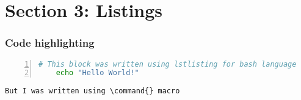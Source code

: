 \documentclass[11pt,aspectratio=169]{beamer}  %
\newcommand*{\escape}[1]{\textbackslash#1}
\newcommand{\command}[1]{\colorbox{blue!20}{\texttt{\scriptsize#1}}}
\begin{document}



\section{Section 3: Listings}  %
\begin{frame}[fragile]\frametitle{Code highlighting}  %

  \begin{lstlisting}[basicstyle=\small\ttfamily,numbers=left,language=bash]
    # This block was written using lstlisting for bash language
    echo "Hello World!"
  \end{lstlisting}

  \command{But I was written using \escape{}command\{\} macro}
\end{frame}






\end{document}
